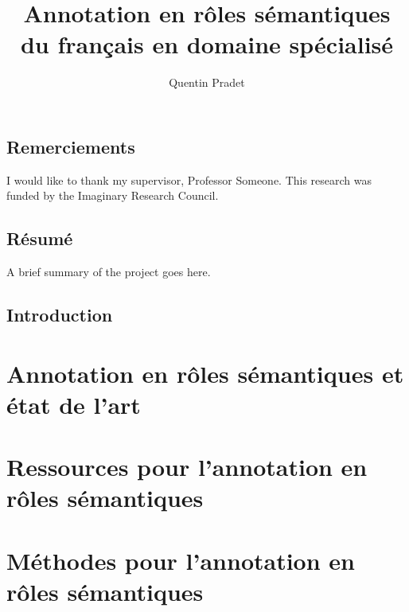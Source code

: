 \documentclass[oneside,parskip]{scrbook}
\title{Annotation en rôles sémantiques du français en domaine spécialisé}
\author{Quentin Pradet}
\date{}
\begin{document}
\maketitle

\frontmatter
\tableofcontents
\listoffigures
\listoftables

\chapter{Remerciements}

I would like to thank my supervisor, Professor Someone. This
research was funded by the Imaginary Research Council.

\chapter{Résumé}

A brief summary of the project goes here.


\mainmatter

\chapter{Introduction}
\label{ch:intro}

\part{Annotation en rôles sémantiques et état de l'art}





\part{Ressources pour l'annotation en rôles sémantiques}





\part{Méthodes pour l'annotation en rôles sémantiques}
\end{document}
